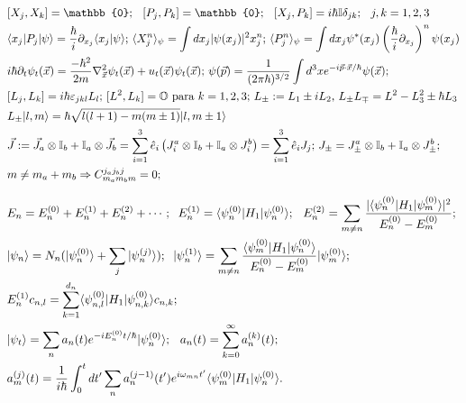 \documentclass[11pt]{article}
\begin{document}
\begin{align}
& [X_{j},X_{k}] = \mathbb{0} \text{; }\hspace{0.2cm} [P_{j},P_{k}] = \mathbb{0}\text{; } \hspace{0.2cm} [X_{j},P_{k}] = i\hbar\mathbb{I}\delta_{jk}\text{; } \hspace{0.2cm} j,k=1,2,3 \\
& \langle x_{j}|P_{j}|\psi\rangle = \frac{\hbar}{i}\partial_{x_{j}}\langle x_{j}|\psi\rangle \text{; } \langle X_{j}^{n}\rangle_{\psi} = \int dx_{j}|\psi(x_{j})|^{2}x_{j}^{n} \text{; } \langle P_{j}^{n}\rangle_{\psi} = \int dx_{j}\psi^{*}(x_{j})\left(\frac{\hbar}{i}\partial_{x_{j}} \right)^{n}\psi(x_{j}) \\
& i\hbar\partial_{t}\psi_{t}(\vec{x}) = \frac{-\hbar^{2}}{2m}\nabla^{2}_{\vec{x}}\psi_{t}(\vec{x}) + u_{t}(\vec{x})\psi_{t}(\vec{x}) \text{; } \psi(\vec{p}) = \frac{1}{(2\pi\hbar)^{3/2}}\int d^{3}x e^{-i\vec{p}\cdot\vec{x}/\hbar}\psi(\vec{x})  \text{; } \\
& [L_{j},L_{k}] = i\hbar\varepsilon_{jkl}L_{l} \text{; } [L^{2},L_{k}] = \mathbb{O}  \text{ para } k=1,2,3 \text{; } L_{\pm} := L_{1} \pm iL_{2} \text{, } L_{\pm}L_{\mp} = L^{2} - L_{3}^{2} \pm\hbar L_{3} \\
& L_{\pm}|l,m\rangle = \hbar\sqrt{l(l+1)-m(m\pm1)}|l,m\pm1\rangle \\
& \vec{J} := \vec{J}_{a}\otimes\mathbb{I}_{b} + \mathbb{I}_{a}\otimes\vec{J}_{b} = \sum_{i=1}^{3}\hat{e}_{i}\left(J_{i}^{a}\otimes\mathbb{I}_{b} + \mathbb{I}_{a}\otimes J_{i}^{b}\right)=\sum_{i=1}^{3}\hat{e}_{i}J_{j} \text{; } J_{\pm} = J_{\pm}^{a}\otimes\mathbb{I}_{b} + \mathbb{I}_{a}\otimes J_{\pm}^{b}  \text{; } \\
& m \ne m_{a}+m_{b} \Rightarrow C_{m_{a}m_{b}m}^{j_{a}j_{b}j}=0 \text{; }
\end{align}

    \begin{align}
& E_{n}=E_{n}^{(0)}+ E_{n}^{(1)} + E_{n}^{(2)}+\cdots; \hspace{0.2cm} E_{n}^{(1)} = \langle\psi_{n}^{(0)}|H_{1}|\psi_{n}^{(0)}\rangle \text{; } \hspace{0.2cm} E_{n}^{(2)} = \sum_{m\ne n}\frac{|\langle\psi_{n}^{(0)}|H_{1}|\psi_{m}^{(0)}\rangle|^{2}}{E_{n}^{(0)}-E_{m}^{(0)}} \text{; }  \\
& |\psi_{n}\rangle = N_{n}(|\psi_{n}^{(0)}\rangle+\sum_{j}|\psi_{n}^{(j)}\rangle); \hspace{0.2cm} |\psi_{n}^{(1)}\rangle = \sum_{m\ne n}\frac{\langle\psi_{m}^{(0)}|H_{1}|\psi_{n}^{(0)}\rangle}{E_{n}^{(0)}-E_{m}^{(0)}}|\psi_{m}^{(0)}\rangle \text{; }  \\
& E_{n}^{(1)}c_{n,l} = \sum_{k=1}^{d_{n}}\langle\psi_{n,l}^{(0)}|H_{1}|\psi_{n,k}^{(0)}\rangle c_{n,k}; \\
& |\psi_{t}\rangle = \sum_{n}a_{n}(t)e^{-iE_{n}^{(0)}t/\hbar}|\psi_{n}^{(0)}\rangle \text{; }  \hspace{0.2cm} a_{n}(t) = \sum_{k=0}^{\infty}a_{n}^{(k)}(t) \text{; }  \\ 
& a_{m}^{(j)}(t) = \frac{1}{i\hbar}\int_{0}^{t}dt'\sum_{n}a_{n}^{(j-1)}(t')e^{i\omega_{mn}t'}\langle\psi_{m}^{(0)}|H_{1}|\psi_{n}^{(0)}\rangle.
\end{align}


    
    
    
    
\end{document}
